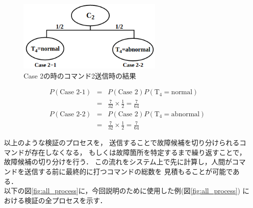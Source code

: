 \documentclass[11pt]{jsreport}
\begin{document}
\begin{figure}[H]
   \centering
      \includegraphics[height=3.5cm]{figure/TEL_result_process2.png}
      \caption{Case 2の時のコマンド2送信時の結果}
      \label{fig:TEL_result2}
\end{figure}
\vspace{-1zh}
\begin{eqnarray}
   P(\text{Case 2-1})  &=& P(\text{Case 2}) P(\text{T}_4=\text{normal}) \nonumber \\
     &=& \frac{7}{32} \times \frac{1}{2} = \frac{7}{64} \label{eq:T4=normal} \\
   P(\text{Case 2-2})  &=& P(\text{Case 2}) P(\text{T}_4=\text{abnormal}) \nonumber \\
     &=& \frac{7}{32} \times \frac{1}{2} = \frac{7}{64} \label{eq:T4=abnormal}
\end{eqnarray}

以上のような検証のプロセスを，
送信することで故障候補を切り分けられるコマンドが存在しなくなる，
もしくは故障箇所を特定するまで繰り返すことで，故障候補の切り分けを行う．
この流れをシステム上で先に計算し，人間がコマンドを送信する前に最終的に打つコマンドの総数を
見積もることが可能である．\\
以下の図\ref{fig:all_process}に，今回説明のために使用した例(図\ref{fig:all_process})%
における検証の全プロセスを示す．
\end{document}
